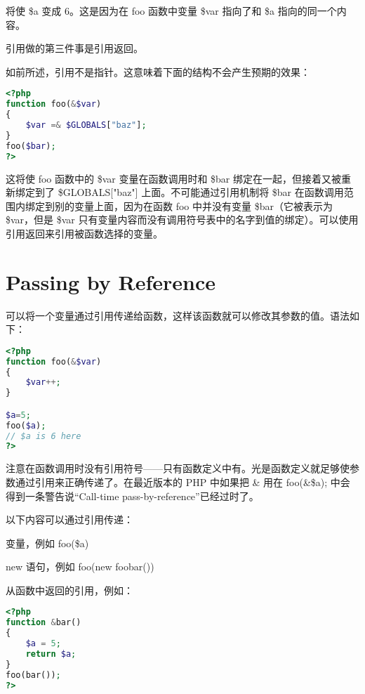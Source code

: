 将使 \$a 变成 6。这是因为在 foo 函数中变量 \$var 指向了和 \$a 指向的同一个内容。

引用做的第三件事是引用返回。







如前所述，引用不是指针。这意味着下面的结构不会产生预期的效果：


\begin{lstlisting}[language=PHP]
<?php
function foo(&$var)
{
    $var =& $GLOBALS["baz"];
}
foo($bar);
?>
\end{lstlisting}


这将使 foo 函数中的 \$var 变量在函数调用时和 \$bar 绑定在一起，但接着又被重新绑定到了 \$GLOBALS["baz"] 上面。不可能通过引用机制将 \$bar 在函数调用范围内绑定到别的变量上面，因为在函数 foo 中并没有变量 \$bar（它被表示为 \$var，但是 \$var 只有变量内容而没有调用符号表中的名字到值的绑定）。可以使用引用返回来引用被函数选择的变量。


\chapter{Passing by Reference}

可以将一个变量通过引用传递给函数，这样该函数就可以修改其参数的值。语法如下：


\begin{lstlisting}[language=PHP]
<?php
function foo(&$var)
{
    $var++;
}

$a=5;
foo($a);
// $a is 6 here
?>
\end{lstlisting}


注意在函数调用时没有引用符号——只有函数定义中有。光是函数定义就足够使参数通过引用来正确传递了。在最近版本的 PHP 中如果把 \& 用在 foo(\&\$a); 中会得到一条警告说“Call-time pass-by-reference”已经过时了。

以下内容可以通过引用传递：


\begin{compactitem}
\item 变量，例如 foo(\$a)
\item new 语句，例如 foo(new foobar())
\item 从函数中返回的引用，例如：
\end{compactitem}

\begin{lstlisting}[language=PHP]
<?php
function &bar()
{
    $a = 5;
    return $a;
}
foo(bar());
?>
\end{lstlisting}


